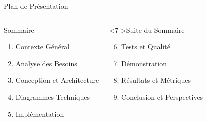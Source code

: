 \documentclass[aspectratio=169]{beamer}
\begin{document}
\begin{frame}[plain]
\begin{center}
    \end{center}
\end{frame}

\begin{frame}{Plan de Présentation}
    \begin{columns}[T]
        \begin{block}{Sommaire}
            \begin{enumerate}
                \item<2-> Contexte Général
                \item<3-> Analyse des Besoins
                \item<4-> Conception et Architecture
                \item<5-> Diagrammes Techniques
                \item<6-> Implémentation
            \end{enumerate}
        \end{block}

        \begin{block}<7->{Suite du Sommaire}
            \begin{enumerate}
                \setcounter{enumi}{5}
                \item<8-> Tests et Qualité
                \item<9-> Démonstration
                \item<10-> Résultats et Métriques
                \item<11-> Conclusion et Perspectives
            \end{enumerate}
        \end{block}
    \end{columns}

\end{frame}
\end{document}
